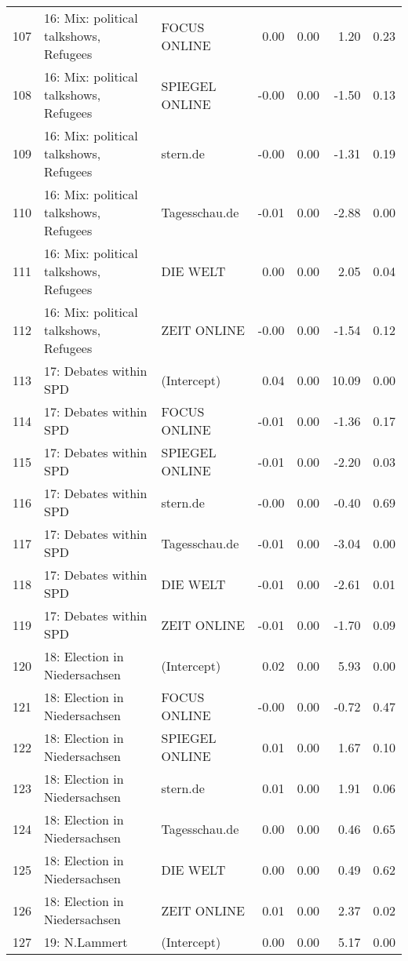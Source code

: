 \begin{table}[ht]
{\begin{tabular}{rllrrrr}
  107 & 16: Mix: political talkshows, Refugees & FOCUS ONLINE & 0.00 & 0.00 & 1.20 & 0.23 \\ 
  108 & 16: Mix: political talkshows, Refugees & SPIEGEL ONLINE & -0.00 & 0.00 & -1.50 & 0.13 \\ 
  109 & 16: Mix: political talkshows, Refugees & stern.de & -0.00 & 0.00 & -1.31 & 0.19 \\ 
  110 & 16: Mix: political talkshows, Refugees & Tagesschau.de & -0.01 & 0.00 & -2.88 & 0.00 \\ 
  111 & 16: Mix: political talkshows, Refugees & DIE WELT & 0.00 & 0.00 & 2.05 & 0.04 \\ 
  112 & 16: Mix: political talkshows, Refugees & ZEIT ONLINE & -0.00 & 0.00 & -1.54 & 0.12 \\ 
  113 & 17: Debates within SPD & (Intercept) & 0.04 & 0.00 & 10.09 & 0.00 \\ 
  114 & 17: Debates within SPD & FOCUS ONLINE & -0.01 & 0.00 & -1.36 & 0.17 \\ 
  115 & 17: Debates within SPD & SPIEGEL ONLINE & -0.01 & 0.00 & -2.20 & 0.03 \\ 
  116 & 17: Debates within SPD & stern.de & -0.00 & 0.00 & -0.40 & 0.69 \\ 
  117 & 17: Debates within SPD & Tagesschau.de & -0.01 & 0.00 & -3.04 & 0.00 \\ 
  118 & 17: Debates within SPD & DIE WELT & -0.01 & 0.00 & -2.61 & 0.01 \\ 
  119 & 17: Debates within SPD & ZEIT ONLINE & -0.01 & 0.00 & -1.70 & 0.09 \\ 
  120 & 18: Election in Niedersachsen & (Intercept) & 0.02 & 0.00 & 5.93 & 0.00 \\ 
  121 & 18: Election in Niedersachsen & FOCUS ONLINE & -0.00 & 0.00 & -0.72 & 0.47 \\ 
  122 & 18: Election in Niedersachsen & SPIEGEL ONLINE & 0.01 & 0.00 & 1.67 & 0.10 \\ 
  123 & 18: Election in Niedersachsen & stern.de & 0.01 & 0.00 & 1.91 & 0.06 \\ 
  124 & 18: Election in Niedersachsen & Tagesschau.de & 0.00 & 0.00 & 0.46 & 0.65 \\ 
  125 & 18: Election in Niedersachsen & DIE WELT & 0.00 & 0.00 & 0.49 & 0.62 \\ 
  126 & 18: Election in Niedersachsen & ZEIT ONLINE & 0.01 & 0.00 & 2.37 & 0.02 \\ 
  127 & 19: N.Lammert & (Intercept) & 0.00 & 0.00 & 5.17 & 0.00 \\ 

\end{tabular}}
\end{table}
